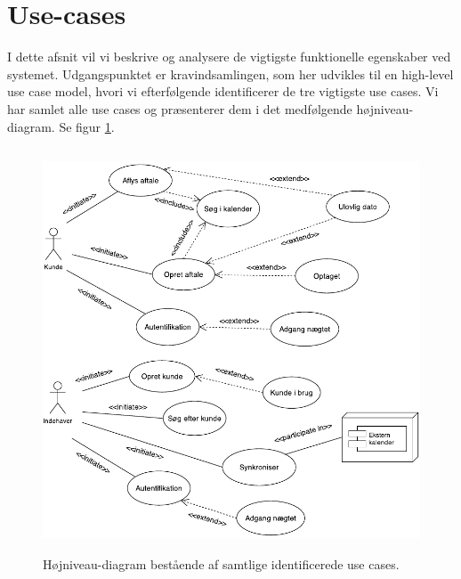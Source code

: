\documentclass[12pt]{article}   %
\begin{document}
\pagebreak

\section{Use-cases}
I dette afsnit vil vi beskrive og analysere de vigtigste funktionelle
egenskaber ved systemet. Udgangspunktet er kravindsamlingen, som her udvikles
til en high-level use case model, hvori vi efterfølgende identificerer de tre
vigtigste use cases. Vi har samlet alle use cases og præsenterer dem i det
medfølgende højniveau-diagram. Se figur \ref{fig:use}.

\begin{figure}[!ht]
\begin{center}
\includegraphics[width=12cm, height=12cm]{highlevel.pdf}
\caption{Højniveau-diagram bestående af samtlige identificerede use cases.}
\label{fig:use}
\end{center}
\end{figure}
\end{document}
